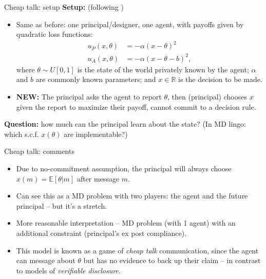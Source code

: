 \documentclass[english,10pt
,aspectratio=169
]{beamer}
\begin{document}
\begin{frame}{Cheap talk: setup}
	\textbf{Setup:} (following \cite{crawford_strategic_1982})
	\begin{itemize}
		\item Same as before: one principal/designer, one agent, with payoffs given by quadratic loss functions:
		\begin{align*}
			u_P(x,\theta) &= - \alpha (x-\theta)^2
			\\
			u_A(x,\theta) &= - \alpha (x-\theta-b)^2,
		\end{align*}
		where $\theta \sim U[0,1]$ is the state of the world privately known by the agent; $\alpha$ and $b$ are commonly known parameters; and $x \in \mathbb{R}$ is the decision to be made.
		\item \textbf{NEW:} The principal asks the agent to report $\theta$, then (principal) chooses $x$ given the report to maximize their payoff, \alert{cannot commit} to a decision rule.
	\end{itemize}
	\textbf{Question:} how much can the principal learn about the state? (In MD lingo: which s.c.f. $x(\theta)$ are implementable?)
\end{frame}


\begin{frame}{Cheap talk: comments}
	\begin{itemize}
		\item Due to no-commitment assumption, the principal will always choose $x(m) = \mathbb{E}[\theta|m]$ after message $m$.
		\item Can see this as a MD problem with two players: the agent and the future principal -- but it's a stretch. %
		\item More reasonable interpretation -- MD problem (with 1 agent) with an additional constraint (principal's ex post compliance).
		\item This model is known as a game of \emph{cheap talk} communication, since the agent can message about $\theta$ but has no evidence to back up their claim -- in contrast to models of \emph{verifiable disclosure}.
	\end{itemize}
\end{frame}
\end{document}
